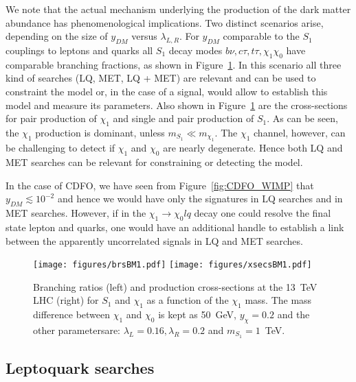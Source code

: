 \documentclass[11pt]{cernrep}
\begin{document}
We note that the actual mechanism underlying the production of the dark matter abundance has phenomenological implications. Two distinct scenarios arise, depending on the size of $y_{DM}$ versus $\lambda_{L,R}$. For $y_{DM}$ comparable to the $S_1$ couplings to leptons and quarks all $S_1$ decay modes $b \nu, c \tau, t \tau, \chi_1 \chi_0$ have comparable branching fractions,
as shown in Figure~\ref{fig:xsecBRs}. In this scenario all three kind of searches (LQ, MET, LQ + MET) are relevant and can be used to constraint the model or, in the case of a signal,  would allow to establish this model and measure its parameters.
Also shown in Figure~\ref{fig:xsecBRs} are the cross-sections for pair production of $\chi_1$ and single and pair production of $S_1$. As can be seen, the $\chi_1$ production is dominant, unless $m_{S_1} \ll m_{\chi_1}$. The $\chi_1$ channel, however, can be challenging to detect if $\chi_1$ and $\chi_0$ are nearly degenerate. Hence both LQ and MET searches can be relevant for constraining or detecting the model.


In the case of CDFO, we have seen from Figure~\ref{fig:CDFO_WIMP} that $y_{DM} \lesssim 10^{-2}$ and hence we would have only the signatures in LQ searches and in MET searches. However, if in the $\chi_1 \to \chi_0 l q$ decay one could resolve the final state lepton and quarks, one would have an additional handle to establish a link between the apparently uncorrelated signals in LQ and MET searches.

\begin{figure}[!h]
	\centering
	\texttt{[image: figures/brsBM1.pdf]}
	\texttt{[image: figures/xsecsBM1.pdf]}
	\caption{Branching ratios (left) and production cross-sections at the 13~TeV  LHC (right) for $S_1$ and $\chi_1$ as a function of the $\chi_1$ mass. The mass difference between $\chi_1$ and $\chi_0$ is kept as 50~GeV, $y_{\chi} = 0.2$ and the other parametersare: $\lambda_L = 0.16, \lambda_R = 0.2$ and $m_{S_1} = 1$~TeV.
		\label{fig:xsecBRs}
	}
\end{figure}





\subsection{Leptoquark searches}
\end{document}
